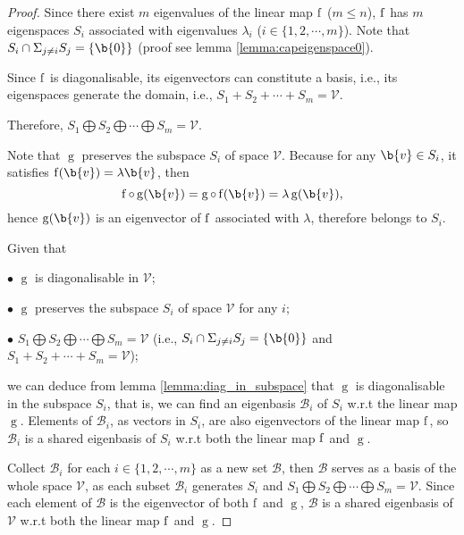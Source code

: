 \begin{proof} 

Since there exist $m$ eigenvalues of the linear map $\operatorname{f}$ ($m \leq n$), $\operatorname{f}$ has $m$ eigenspaces $S_i$ associated with eigenvalues $\lambda_i$ ($i \in \{1, 2, \cdots, m\}$). Note that $S_i \cap \Sigma_{j \neq i} S_j = \{\b{0}\}$ (proof see lemma \ref{lemma:capeigenspace0}).

Since $\operatorname{f}$ is diagonalisable, its eigenvectors can constitute a basis, i.e., its eigenspaces generate the domain,  i.e., $S_1 + S_2 + \cdots + S_m = \mathcal{V}$.

Therefore, $S_1 \bigoplus S_2 \bigoplus \cdots \bigoplus S_m = \mathcal{V}$.

Note that $\operatorname{g}$ preserves the subspace $S_i$ of space $\mathcal{V}$. Because for any  $\b{v} \in S_i$, it satisfies $\f(\b{v}) = \lambda \b{v}$, then $$ \f \circ \operatorname{g}(\b{v}) = \operatorname{g} \circ \f(\b{v}) = \lambda \operatorname{g}(\b{v}),$$
hence $\operatorname{g}(\b{v})$ is an eigenvector of $\operatorname{f}$ associated with $\lambda$, therefore belongs to $S_i$.

Given that 

$\bullet$ $\operatorname{g}$ is diagonalisable in $\mathcal{V}$;

$\bullet$ $\operatorname{g}$ preserves the subspace $S_i$ of space $\mathcal{V}$ for any $i$;

$\bullet$ $S_1 \bigoplus S_2 \bigoplus \cdots \bigoplus S_m = \mathcal{V}$ (i.e., $S_i \cap \Sigma_{j \neq i} S_j = \{\b{0}\}$ and $S_1 + S_2 + \cdots + S_m = \mathcal{V}$);

we can deduce from lemma \ref{lemma:diag_in_subspace} that $\operatorname{g}$ is diagonalisable in the subspace $S_i$, that is, we can find an eigenbasis $\mathscr{B}_i$ of $S_i$ w.r.t the linear map $\operatorname{g}$. Elements of $\mathscr{B}_i$, as vectors in $S_i$, are also eigenvectors of the linear map $\operatorname{f}$, so $\mathscr{B}_i$ is a shared eigenbasis of $S_i$ w.r.t both the linear map $\operatorname{f}$ and $\operatorname{g}$.

Collect $\mathscr{B}_i$ for each $i \in \{1, 2, \cdots, m\}$ as a new set $\mathscr{B}$, then $\mathscr{B}$ serves as a basis of the whole space $\mathcal{V}$, as each subset $\mathscr{B}_i$ generates $S_i$ and $S_1 \bigoplus S_2 \bigoplus \cdots \bigoplus S_m = \mathcal{V}$. Since each element of $\mathscr{B}$ is the eigenvector of both $\operatorname{f}$ and $\operatorname{g}$, $\mathscr{B}$ is a shared eigenbasis of $\mathcal{V}$ w.r.t both the linear map $\operatorname{f}$ and $\operatorname{g}$.

\end{proof}


